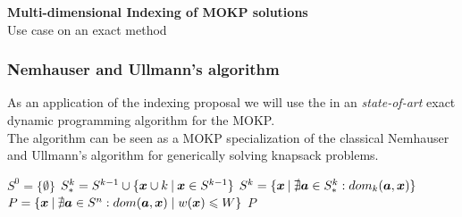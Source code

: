 %
\begin{frame}
\frametitle{}
\begin{center}
  \textbf{\Large Multi-dimensional Indexing of MOKP solutions}
  \\ \bigskip \bigskip
  {\large Use case on an exact method}
\end{center}
\end{frame}

%
\begin{frame}
\frametitle{Nemhauser and Ullmann's algorithm}
As an application of the indexing proposal we will use the \kdtree{}
in an \textit{state-of-art} exact dynamic programming algorithm for the MOKP.
\\ \bigskip \pause
The algorithm can be seen as a MOKP specialization of the classical
Nemhauser and Ullmann's algorithm for generically solving knapsack problems.
\\ \bigskip \pause
\begin{algorithmic}[1] %
     \pause
    \State $S^0 = \big\{\emptyset\big\}$ \pause
      \State $S_*^k = S^{k-1} \cup \{\boldsymbol{x} \cup k \:|\: \boldsymbol{x} \in S^{k-1}\}$
         \pause
      \State $S^k = \{\boldsymbol{x} \:|\: \nexists \boldsymbol{a} \in S_*^k: dom_k(\boldsymbol{a}, \boldsymbol{x}) \}$
    \EndFor \pause
  \State $P = \{\boldsymbol{x} \:|\: \nexists \boldsymbol{a} \in S^n: dom(\boldsymbol{a}, \boldsymbol{x}) \;|\; w(\boldsymbol{x}) \leqslant W \}$
     \pause
  \State \Return $P$
  \EndFunction
\end{algorithmic}
\end{frame}

